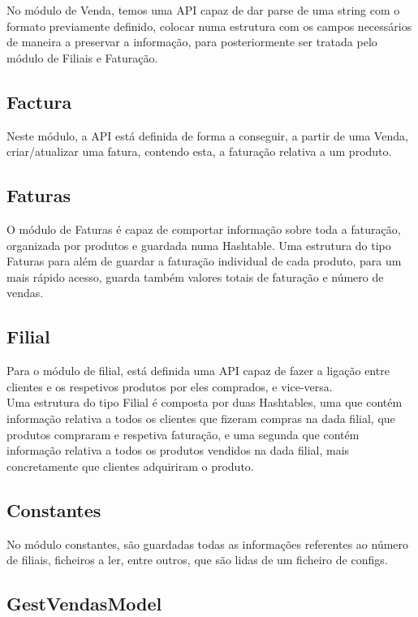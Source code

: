 \documentclass[a4paper]{report}
\begin{document}
No módulo de Venda, temos uma API capaz de dar parse de uma string com o formato 
previamente definido, colocar numa estrutura com os campos necessários de maneira
a preservar a informação, para posteriormente ser tratada pelo módulo de Filiais e
Faturação.

\subsection{Factura}

Neste módulo, a API está definida de forma a conseguir, a partir de uma Venda,
criar/atualizar uma fatura, contendo esta, a faturação relativa a um produto.

\subsection{Faturas}

O módulo de Faturas é capaz de comportar informação sobre toda a faturação,
organizada por produtos e guardada numa Hashtable. Uma estrutura do tipo Faturas
para além de guardar a faturação individual de cada produto, para um mais rápido 
acesso, guarda também valores totais de faturação e número de vendas.

\subsection{Filial}

Para o módulo de filial, está definida uma API capaz de fazer a ligação entre 
clientes e os respetivos produtos por eles comprados, e vice-versa.\\
Uma estrutura do tipo Filial é composta por duas Hashtables, uma que contém
informação relativa a todos os clientes que fizeram compras na dada filial, 
que produtos compraram e respetiva faturação, e uma segunda que contém 
informação relativa a todos os produtos vendidos na dada filial, mais 
concretamente que clientes adquiriram o produto.

\subsection{Constantes}

No módulo constantes, são guardadas todas as informações referentes ao número de
filiais, ficheiros a ler, entre outros, que são lidas de um ficheiro de configs.

\subsection{GestVendasModel}
\end{document}
